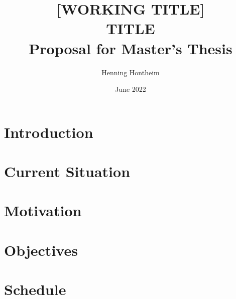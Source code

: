 \documentclass[12pt,a4paper,oneside]{article}
\title{[WORKING TITLE]\\ TITLE\\[1em] \large Proposal for Master's Thesis}
\author{Henning Hontheim}
\date{June 2022}
\begin{document}
\maketitle

\section{Introduction}


\section{Current Situation}


\section{Motivation}


\section{Objectives}


\section{Schedule}


\newpage
\printbibliography
\end{document}
